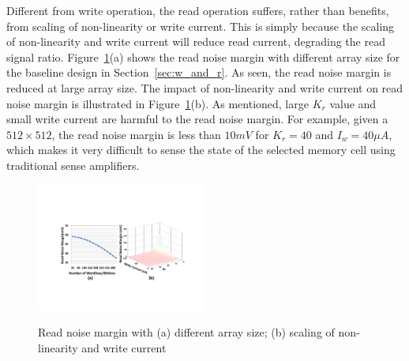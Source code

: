 Different from write operation, the read operation suffers, rather than benefits, from scaling of non-linearity or write current. This is simply because the scaling of non-linearity and write current will reduce read current, degrading the read signal ratio. Figure~\ref{fig:sense_margin}(a) shows the read noise margin with different array size for the baseline design in Section~\ref{sec:w_and_r}.  As seen, the read noise margin is reduced at large array size. The impact of non-linearity and write current on read noise margin is illustrated in Figure~\ref{fig:sense_margin}(b). As mentioned, large $K_r$ value and small write current are harmful to the read noise margin. For example, given a $512 \times 512$, the read noise margin is less than $10mV$ for $K_r=40$ and $I_w=40\mu A$, which makes it very difficult to sense the state of the selected memory cell using traditional sense amplifiers.

\begin{figure}[!t]
\centering
  \includegraphics[width=0.5\textwidth]{./figures/read}\\
  \caption{Read noise margin with (a) different array size; (b) scaling of non-linearity and write current}\label{fig:sense_margin}
\end{figure}



